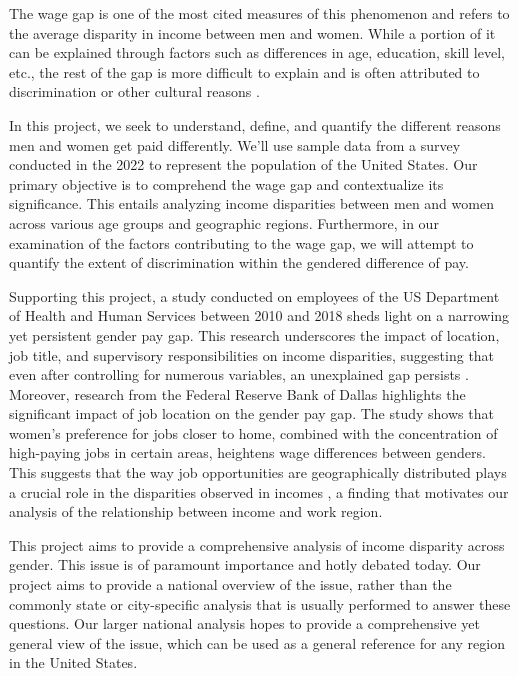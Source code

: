 \documentclass{article}
\begin{document}
The wage gap is one of the most cited measures of this phenomenon and refers to the average disparity in income between men and women. While a portion of it can be explained through factors such as differences in age, education, skill level, etc., the rest of the gap is more difficult to explain and is often attributed to discrimination or other cultural reasons \cite{issuebrief}.

In this project, we seek to understand, define, and quantify the different reasons men and women get paid differently. We’ll use sample data from a survey conducted in the 2022 to represent the population of the United States. Our primary objective is to comprehend the wage gap and contextualize its significance. This entails analyzing income disparities between men and women across various age groups and geographic regions. Furthermore, in our examination of the factors contributing to the wage gap, we will attempt to quantify the extent of discrimination within the gendered difference of pay.

Supporting this project, a study conducted on employees of the US Department of Health and Human Services between 2010 and 2018 sheds light on a narrowing yet persistent gender pay gap. This research underscores the impact of location, job title, and supervisory responsibilities on income disparities, suggesting that even after controlling for numerous variables, an unexplained gap persists \cite{HRfH}. Moreover, research from the Federal Reserve Bank of Dallas highlights the significant impact of job location on the gender pay gap. The study shows that women's preference for jobs closer to home, combined with the concentration of high-paying jobs in certain areas, heightens wage differences between genders. This suggests that the way job opportunities are geographically distributed plays a crucial role in the disparities observed in incomes \cite{DallasFed},
a finding that motivates our analysis of the relationship between income and work region.

This project aims to provide a comprehensive analysis of income disparity across gender. This issue is of paramount importance and hotly debated today.
Our project aims to provide a national overview of the issue, rather than the commonly state or city-specific analysis that is usually performed to answer these questions.
Our larger national analysis hopes to provide a comprehensive yet general view of the issue, which can be used as a general reference for any region in the United States.
\end{document}
